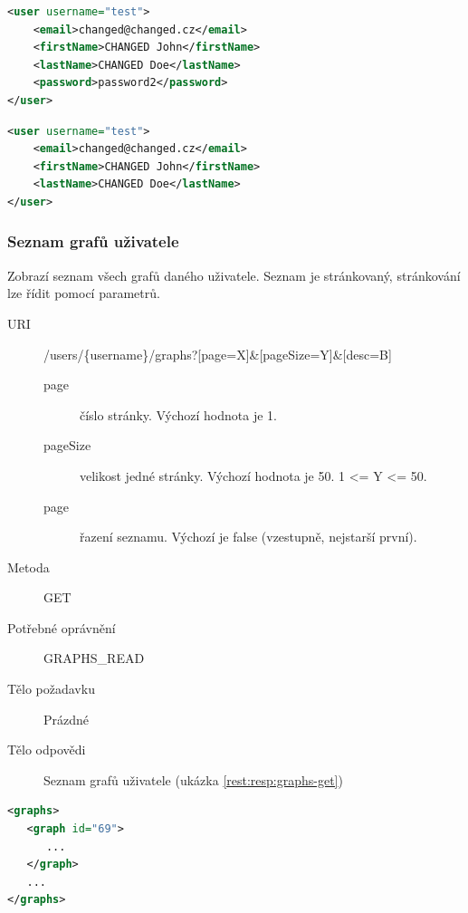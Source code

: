 \documentclass[thesis=M,czech]{FITthesis}[2014/05/6]
\begin{document}
\begin{lstlisting}[caption=Tělo požadavku zdroje /users/\{username\} (PUT), label=rest:req:user-put, language=xml]
<user username="test">
    <email>changed@changed.cz</email>
    <firstName>CHANGED John</firstName>
    <lastName>CHANGED Doe</lastName>
    <password>password2</password>
</user>
\end{lstlisting}  

\begin{lstlisting}[caption=Tělo odpovědi zdroje /users/\{username\} (PUT), label=rest:resp:user-put, language=xml]
<user username="test">   
    <email>changed@changed.cz</email>
    <firstName>CHANGED John</firstName>
    <lastName>CHANGED Doe</lastName>
</user>
\end{lstlisting}

\subsubsection{Seznam grafů uživatele}
Zobrazí seznam všech grafů daného uživatele. Seznam je stránkovaný, stránkování lze řídit pomocí parametrů.
\begin{description}
  \item[URI] /users/\{username\}/graphs?[page=X]\&[pageSize=Y]\&[desc=B]
  \begin{description}
     \item[page] číslo stránky. Výchozí hodnota je 1.
     \item[pageSize] velikost jedné stránky. Výchozí hodnota je 50. 1 <= Y <= 50.
     \item[page] řazení seznamu. Výchozí je false (vzestupně, nejstarší první).
  \end{description}	
  \item[Metoda] GET
  \item[Potřebné oprávnění] GRAPHS\_READ
  \item[Tělo požadavku] Prázdné
  \item[Tělo odpovědi] Seznam grafů uživatele (ukázka \ref{rest:resp:graphs-get})
\end{description}

\begin{lstlisting}[caption=Tělo odpovědi zdroje /users/\{username\}/graphs (GET), label=rest:resp:graphs-get, language=xml]
<graphs>
   <graph id="69">
      ...
   </graph>
   ...
</graphs>
\end{lstlisting}  
\end{document}

